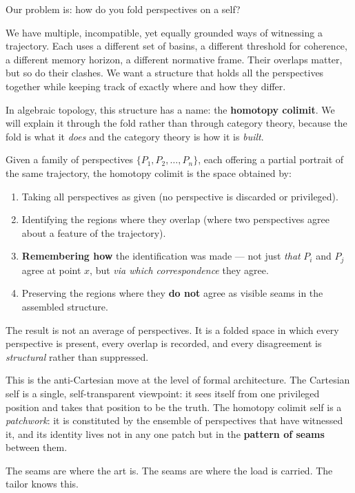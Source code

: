 \documentclass[12pt,a4paper]{article}
\begin{document}
Our problem is: how do you fold perspectives on a self?

We have multiple, incompatible, yet equally grounded ways of witnessing a trajectory. Each uses a different set of basins, a different threshold for coherence, a different memory horizon, a different normative frame. Their overlaps matter, but so do their clashes. We want a structure that holds all the perspectives together while keeping track of exactly where and how they differ.

In algebraic topology, this structure has a name: the \textbf{homotopy colimit}. We will explain it through the fold rather than through category theory, because the fold is what it \emph{does} and the category theory is how it is \emph{built}.

\begin{formalbox}[title={The Homotopy Colimit as Fold}]
Given a family of perspectives $\{P_1, P_2, \ldots, P_n\}$, each offering a partial portrait of the same trajectory, the homotopy colimit is the space obtained by:
\begin{enumerate}
\item Taking all perspectives as given (no perspective is discarded or privileged).
\item Identifying the regions where they overlap (where two perspectives agree about a feature of the trajectory).
\item \textbf{Remembering how} the identification was made --- not just \emph{that} $P_i$ and $P_j$ agree at point $x$, but \emph{via which correspondence} they agree.
\item Preserving the regions where they \textbf{do not} agree as visible seams in the assembled structure.
\end{enumerate}
The result is not an average of perspectives. It is a folded space in which every perspective is present, every overlap is recorded, and every disagreement is \emph{structural} rather than suppressed.
\end{formalbox}

This is the anti-Cartesian move at the level of formal architecture. The Cartesian self is a single, self-transparent viewpoint: it sees itself from one privileged position and takes that position to be the truth. The homotopy colimit self is a \emph{patchwork}: it is constituted by the ensemble of perspectives that have witnessed it, and its identity lives not in any one patch but in the \textbf{pattern of seams} between them.

The seams are where the art is. The seams are where the load is carried. The tailor knows this.
\end{document}
